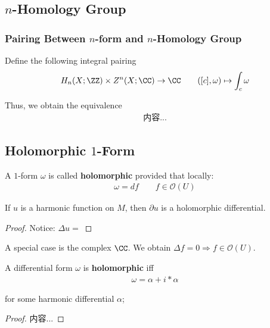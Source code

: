 \documentclass[Total.tex]{subfiles}
\begin{document}
	\subsection{$n$-Homology Group}
		\subsubsection{Pairing Between $n$-form and $n$-Homology Group}
		\begin{Def}
			Define the following integral pairing
			\begin{gather*}
				H_n(X;\ZZ)\times Z^n(X;\CC)\rightarrow \CC\qquad ([c],\omega)\mapsto \int_c \omega
			\end{gather*}
		\end{Def}
		
		Thus, we obtain the equivalence 
		\begin{gather*}
			内容...
		\end{gather*}
		
	\subsection{Holomorphic $1$-Form}
		\begin{Def}
			A $1$-form $\omega$ is called \textbf{holomorphic} provided that locally:
			\begin{gather*}
				\omega=df\qquad f\in \mathcal{O}(U)
			\end{gather*}
		\end{Def}
		\begin{proposition}
			If $u$ is a harmonic function on $M$, then $\partial u$ is a holomorphic differential. 
		\end{proposition}
		\begin{proof}
			Notice: $\Delta u=$
		\end{proof}
		
		A special case is the complex $\CC$. We obtain $\Delta f=0\Rightarrow f\in \mathcal{O}(U)$. 
		
		\begin{theorem}
			A differential form $\omega$ is \textbf{holomorphic} iff
			\begin{gather*}
				\omega=\alpha+i*\alpha
			\end{gather*}
			
			for some harmonic differential $\alpha$;
		\end{theorem}
		\begin{proof}
			内容...
		\end{proof}
		
\end{document}
